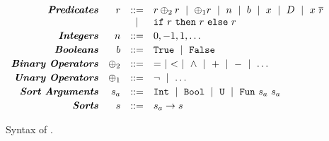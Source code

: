 \begin{figure}[t!]
\captionsetup{justification=centering}
\centering
$$
\begin{array}{rrcl}
\emphbf{Predicates} 
  & \pred & ::= &
    \pred \binop \pred \spmid
    \unop \pred
  \spmid n \spmid b \spmid x \spmid \dc \spmid  x\ \overline{\pred}\\
  && \spmid & \eif{\pred}{\pred}{\pred}
\\[0.03in]

\emphbf{Integers} 
  & n
  & ::= & 0, -1, 1, \dots
\\[0.03in]

\emphbf{Booleans} 
  & b
  & ::= & \etrue \spmid \efalse
\\[0.03in]

\emphbf{Binary Operators} 
  & \binop
  & ::= & = \spmid < \spmid \land \spmid + \spmid - \spmid \dots
\\[0.03in]

\emphbf{Unary Operators} 
  & \unop
  & ::= & \lnot \spmid \dots 
\\[0.03in]

\emphbf{Sort Arguments} 
  & \sort_a
  & ::= & \tint \spmid \tbool \spmid \tuniv 
         \spmid \tsmtfun{\sort_a}{\sort_a}
\\[0.03in]
\emphbf{Sorts} 
  & \sort
  & ::=  & \sort_a \rightarrow \sort
\end{array}
$$
\caption %
         {Syntax of \smtlan.}
\label{fig:smtsyntax}
\end{figure}
